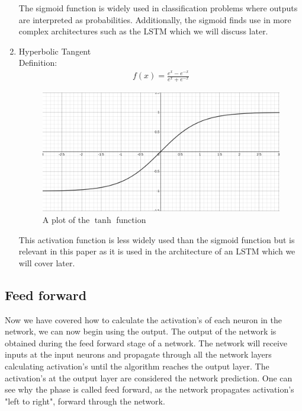 \documentclass{article}
\begin{document}
\begin{enumerate}
\begin{figure}[H]
\end{figure}
The sigmoid function is widely used in classification problems where outputs are interpreted as probabilities. Additionally, the sigmoid finds use in more complex architectures such as the LSTM which we will discuss later. 
\item Hyperbolic Tangent\\
Definition:
\begin{align*}
f(x) = \frac{e^x - e^{-x}}{e^x + e^{-x}}
\end{align*}

\begin{figure}[H]
\centering
\caption{A plot of the $\tanh$ function}
\includegraphics[scale=0.2]{tanh.png}
\end{figure}
This activation function is less widely used than the sigmoid function but is relevant in this paper as it is used in the architecture of an LSTM which we will cover later.
\end{enumerate}

\subsection{Feed forward}
\label{sec:forward}
Now we have covered how to calculate the activation's of each neuron in the network, we can now begin using the output. The output of the network is obtained during the feed forward stage of a network. The network will receive inputs at the input neurons and propagate through all the network layers calculating activation's until the algorithm reaches the output layer. The activation's at the output layer are considered the network prediction. One can see why the phase is called feed forward, as the network propagates activation's "left to right", forward through the network. 
\end{document}
